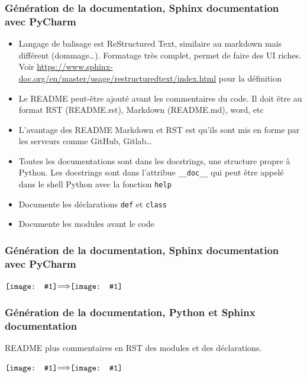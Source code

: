 \documentclass{beamer}
\newcommand*{\vcenterimage}[1]{\vcenter{\hbox{\texttt{[image: \#1]}}}}
\newcommand*{\vcenterarrow}{\vcenter{\hbox{$\Longrightarrow$}}}
\begin{document}
    \begin{frame}[fragile]
        \transdissolve
        \frametitle{Génération de la documentation, Sphinx documentation avec PyCharm}

        \begin{itemize}

            \item Langage de balisage est ReStructured Text, similaire au markdown mais différent (dommage\ldots). Formatage très complet, permet de faire des UI riches.
            Voir \url{https://www.sphinx-doc.org/en/master/usage/restructuredtext/index.html} pour la définition
            \item Le README peut-être ajouté avant les commentaires du code.
            Il doit être au format RST (README.rst), Markdown (README.md), word, etc
            \item L'avantage des README Markdown et RST est qu'ils sont mis en forme par les serveurs comme GitHub, Gitlab\ldots
            \item Toutes les documentations sont dans les docstrings, une structure propre à Python.
            Les docstrings sont dans l'attribue \lstinline{__doc__} qui peut être appelé dans le shell Python avec la fonction \lstinline{help}
            \item Documente les déclarations \lstinline{def} et \lstinline{class}
            \item Documente les modules avant le code

        \end{itemize}

    \end{frame}

    \begin{frame}
        \transdissolve
        \frametitle{Génération de la documentation, Sphinx documentation avec PyCharm}

        \centering
        $\vcenterimage{image/python-rst.png}\vcenterarrow\vcenterimage{image/readme-example.png}$

    \end{frame}

    \begin{frame}
        \transdissolve
        \frametitle{Génération de la documentation, Python et Sphinx documentation}
        README plus commentaires en RST des modules et des déclarations.

        \centering
        $\vcenterimage{image/python-rst-2}\vcenterarrow\vcenterimage{image/readme-plus-code.png}$

    \end{frame}
\end{document}
